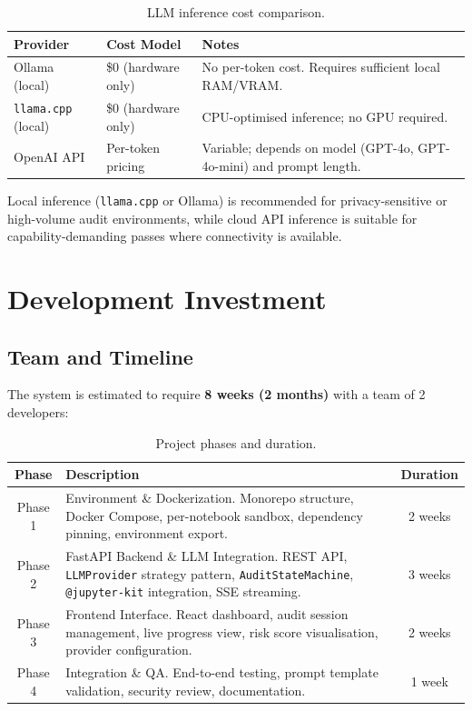 \documentclass[11pt, a4paper]{article}
\begin{document}
\begin{table}[H]
  \centering
  \caption{LLM inference cost comparison.}
  \label{tab:llm-cost}
  \renewcommand{\arraystretch}{1.3}
  \begin{tabularx}{\textwidth}{l l Y}
    \toprule
    \textbf{Provider} & \textbf{Cost Model} & \textbf{Notes} \\
    \midrule
    Ollama (local) & \$0 (hardware only) & No per-token cost. Requires
      sufficient local RAM/VRAM. \\
    \texttt{llama.cpp} (local) & \$0 (hardware only) & CPU-optimised
      inference; no GPU required. \\
    OpenAI API & Per-token pricing & Variable; depends on model (GPT-4o,
      GPT-4o-mini) and prompt length. \\
    \bottomrule
  \end{tabularx}
\end{table}

Local inference (\texttt{llama.cpp} or Ollama) is recommended for
privacy-sensitive or high-volume audit environments, while cloud API
inference is suitable for capability-demanding passes where connectivity is
available.

\section{Development Investment}

\subsection*{Team and Timeline}

The system is estimated to require \textbf{8 weeks (2 months)} with a team of
2 developers:

\begin{table}[H]
  \centering
  \caption{Project phases and duration.}
  \label{tab:phases}
  \renewcommand{\arraystretch}{1.3}
  \begin{tabularx}{\textwidth}{c Y c}
    \toprule
    \textbf{Phase} & \textbf{Description} & \textbf{Duration} \\
    \midrule
    Phase 1 &
    Environment \& Dockerization. Monorepo structure, Docker Compose,
    per-notebook sandbox, dependency pinning, environment export. &
    2 weeks \\

    Phase 2 &
    FastAPI Backend \& LLM Integration. REST API, \texttt{LLMProvider} strategy
    pattern, \texttt{AuditStateMachine}, \texttt{@jupyter-kit} integration,
    SSE streaming. &
    3 weeks \\

    Phase 3 &
    Frontend Interface. React dashboard, audit session management, live
    progress view, risk score visualisation, provider configuration. &
    2 weeks \\

    Phase 4 &
    Integration \& QA. End-to-end testing, prompt template validation,
    security review, documentation. &
    1 week \\
    \bottomrule
  \end{tabularx}
\end{table}
\end{document}

